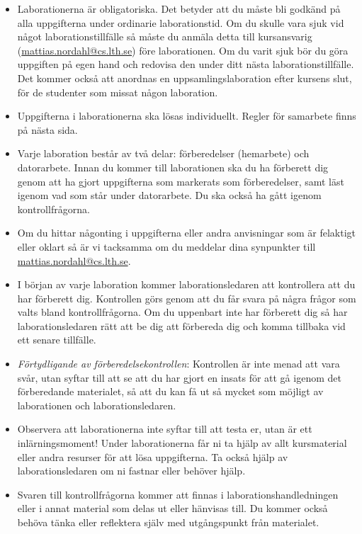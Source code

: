 \documentclass[fleqn, article, a4paper]{memoir}
\begin{document}
\begin{itemize}
	\item Laborationerna är obligatoriska. Det betyder att du måste bli godkänd på alla uppgifterna under ordinarie laborationstid. Om du skulle vara sjuk vid något laborationstillfälle så måste du anmäla detta till kursansvarig (\url{mattias.nordahl@cs.lth.se}) före laborationen. Om du varit sjuk bör du göra uppgiften på egen hand och redovisa den under ditt nästa laborationstillfälle. Det kommer också att anordnas en uppsamlingslaboration efter kursens slut, för de studenter som missat någon laboration.

	\item Uppgifterna i laborationerna ska lösas individuellt. Regler för samarbete finns på nästa sida.

	\item Varje laboration består av två delar: förberedelser (hemarbete) och datorarbete. Innan du kommer till laborationen ska du ha förberett dig genom att ha gjort uppgifterna som markerats som förberedelser, samt läst igenom vad som står under datorarbete. Du ska också ha gått igenom kontrollfrågorna.

	\item Om du hittar någonting i uppgifterna eller andra anvisningar som är felaktigt eller oklart så är vi tacksamma om du meddelar dina synpunkter till \url{mattias.nordahl@cs.lth.se}.


	\item I början av varje laboration kommer laborationsledaren att kontrollera att du har förberett dig. Kontrollen görs genom att du får svara på några frågor som valts bland kontrollfrågorna. Om du uppenbart inte har förberett dig så har laborationsledaren rätt att be dig att förbereda dig och komma tillbaka vid ett senare tillfälle.

	\item \emph{Förtydligande av förberedelsekontrollen}: Kontrollen är inte menad att vara svår, utan syftar till att se att du har gjort en insats för att gå igenom det förberedande materialet, så att du kan få ut så mycket som möjligt av laborationen och laborationsledaren.

	\item Observera att laborationerna inte syftar till att testa er, utan är ett inlärningsmoment! Under laborationerna får ni ta hjälp av allt kursmaterial eller andra resurser för att lösa uppgifterna. Ta också hjälp av laborationsledaren om ni fastnar eller behöver hjälp.

	\item Svaren till kontrollfrågorna kommer att finnas i laborationshandledningen eller i annat material som delas ut eller hänvisas till. Du kommer också behöva tänka eller reflektera själv med utgångspunkt från materialet.
\end{itemize}
\end{document}
